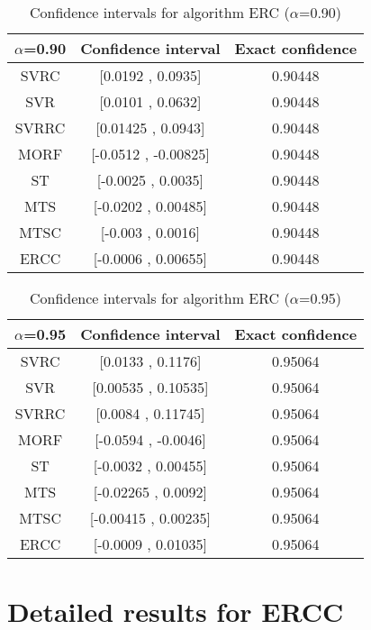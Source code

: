 \documentclass[a4paper,10pt]{article}
\begin{document}
\begin{table}[!htp]
\centering\small
\begin{tabular}{
|c|c|c|}
\hline
 $\alpha$=0.90 & Confidence interval & Exact confidence \\ \hline 
SVRC & [0.0192 , 0.0935] & 0.90448\\ \hline 
SVR & [0.0101 , 0.0632] & 0.90448\\ \hline 
SVRRC & [0.01425 , 0.0943] & 0.90448\\ \hline 
MORF & [-0.0512 , -0.00825] & 0.90448\\ \hline 
ST & [-0.0025 , 0.0035] & 0.90448\\ \hline 
MTS & [-0.0202 , 0.00485] & 0.90448\\ \hline 
MTSC & [-0.003 , 0.0016] & 0.90448\\ \hline 
ERCC & [-0.0006 , 0.00655] & 0.90448\\ \hline 

\end{tabular}
\caption{Confidence intervals for algorithm ERC ($\alpha$=0.90)}
\end{table}
\begin{table}[!htp]
\centering\small
\begin{tabular}{
|c|c|c|}
\hline
 $\alpha$=0.95 & Confidence interval & Exact confidence \\ \hline 
SVRC & [0.0133 , 0.1176] & 0.95064\\ \hline 
SVR & [0.00535 , 0.10535] & 0.95064\\ \hline 
SVRRC & [0.0084 , 0.11745] & 0.95064\\ \hline 
MORF & [-0.0594 , -0.0046] & 0.95064\\ \hline 
ST & [-0.0032 , 0.00455] & 0.95064\\ \hline 
MTS & [-0.02265 , 0.0092] & 0.95064\\ \hline 
MTSC & [-0.00415 , 0.00235] & 0.95064\\ \hline 
ERCC & [-0.0009 , 0.01035] & 0.95064\\ \hline 

\end{tabular}
\caption{Confidence intervals for algorithm ERC ($\alpha$=0.95)}
\end{table}

 \clearpage 


\section{Detailed results for ERCC}
\end{document}

